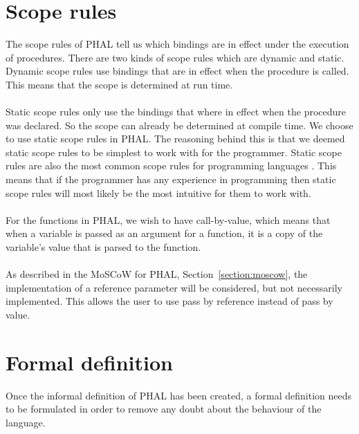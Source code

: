 \section{Scope rules}
The scope rules of PHAL tell us which bindings are in effect under the execution of procedures. 
There are two kinds of scope rules which are dynamic and static.
Dynamic scope rules use bindings that are in effect when the procedure is called. 
This means that the scope is determined at run time.
\\\\
Static scope rules only use the bindings that where in effect when the procedure was declared. 
So the scope can already be determined at compile time.
We choose to use static scope rules in PHAL. 
The reasoning behind this is that we deemed static scope rules to be simplest to work with for the programmer. 
Static scope rules are also the most common scope rules for programming languages \cite{PilenVedTraeetsRod}. 
This means that if the programmer has any experience in programming then static scope rules will most likely be the most intuitive for them to work with. 
\\\\
For the functions in PHAL, we wish to have call-by-value, which means that when a variable is passed as an argument for a function, it is a copy of the variable's value that is parsed to the function.
\\\\
As described in the MoSCoW for PHAL, Section~\ref{section:moscow}, the implementation of a reference parameter will be considered, but not necessarily implemented. 
This allows the user to use pass by reference instead of pass by value.


\section{Formal definition}\label{Def:Semantics}
Once the informal definition of PHAL has been created, a formal definition needs to be formulated in order to remove any doubt about the behaviour of the language. 

